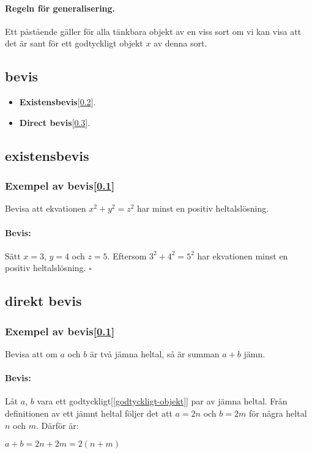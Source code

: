     \paragraph{Regeln för generalisering.} 
        Ett påstående gäller för alla tänkbara objekt av en viss sort om vi kan visa att det är sant för ett godtyckligt objekt $x$ av denna sort.
\subsection{\textbf{bevis}}\label{bevis}
    \begin{itemize}
        \item \textbf{Existensbevis}[\ref{existensbevis}].
        \item \textbf{Direct bevis}[\ref{direct-bevis}]. 
    \end{itemize}
\subsection{\textbf{existensbevis}}\label{existensbevis}
    \subsubsection{Exempel av bevis[\ref{bevis}]}
        Bevisa att ekvationen $x^2 + y^2 = z^2$ har minst en positiv heltalslösning.
        \paragraph{Bevis:} 
            Sätt $x = 3$, $y = 4$ och $z = 5$. Eftersom $3^2 + 4^2 = 5^2$ har ekvationen minst en positiv heltalslösning. $\square$
\subsection{\textbf{direkt bevis}}\label{direct-bevis}
    \subsubsection{Exempel av bevis[\ref{bevis}]}
    Bevisa att om $a$ och $b$ är två jämna heltal, så är summan $a + b$ jämn.
        \paragraph{Bevis:} 
            Låt $a$, $b$ vara ett godtyckligt[\ref{godtyckligt-objekt}] par av jämna heltal. Från definitionen av ett jämnt heltal följer det att $a = 2n$ och $b = 2m$ för några heltal $n$ och $m$. Därför är: 
    \begin{center}
        $a + b = 2n + 2m = 2(n + m)$
    \end{center}


    